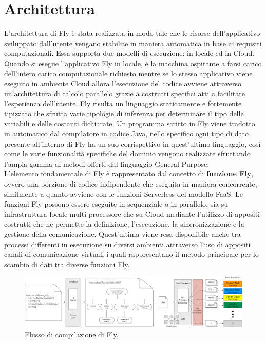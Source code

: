 \section{Architettura}
L'architettura di Fly è stata realizzata in modo tale che le risorse dell'applicativo sviluppato dall'utente vengano stabilite in maniera automatica in base ai requisiti computazionali.
Essa supporta due modelli di esecuzione: in locale ed in Cloud.
Quando si esegue l'applicativo Fly in locale, è la macchina ospitante a farsi carico dell'intero carico computazionale richiesto mentre se lo stesso applicativo viene eseguito in ambiente Cloud allora 
l'esecuzione del codice avviene attraverso un'architettura di calcolo parallelo grazie a costrutti specifici atti a facilitare l'esperienza dell'utente.
Fly risulta un linguaggio staticamente e fortemente tipizzato che sfrutta varie tipologie di inferenza per determinare il tipo delle variabili e delle costanti dichiarate.
Un programma scritto in Fly viene tradotto in automatico dal compilatore in codice Java, nello specifico ogni tipo di dato presente all'interno di Fly ha un suo corrispettivo in quest'ultimo linguaggio, 
così come le varie funzionalità specifiche del dominio vengono realizzate sfruttando l'ampia gamma di metodi offerti dal linguaggio General Purpose. \\
L’elemento fondamentale di Fly è rappresentato dal concetto di \textbf{funzione Fly}, ovvero una porzione di codice indipendente che eseguita in maniera concorrente, 
similmente a quanto avviene con le funzioni Serverless del modello FaaS. Le funzioni Fly possono essere eseguite in sequenziale o in parallelo, sia su infrastruttura locale multi-processore che su Cloud
 mediante l'utilizzo di appositi costrutti che ne permette la definizione, l'esecuzione, la sincronizzazione e la gestione della comunicazione. 
 Quest’ultima viene resa disponibile anche tra processi differenti in esecuzione su diversi ambienti attraverso l'uso di appositi canali di comunicazione virtuali i quali rappresentano 
 il metodo principale per lo scambio di dati tra diverse funzioni Fly. \\ 

\begin{figure}[htbp]
 \centering
 \includegraphics[scale=0.7]{./Figure/FLYCompilazione.png}
 \caption{Flusso di compilazione di Fly.}
 \label{fig:compilazione}
\end{figure}

